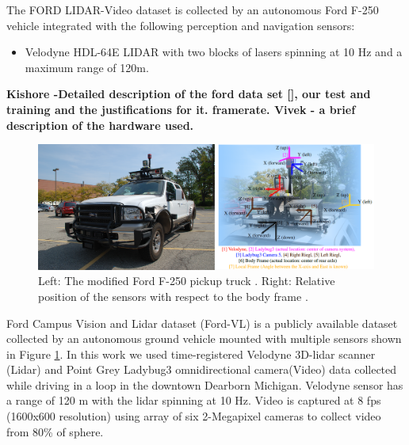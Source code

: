 \documentclass{article}
\begin{document}
The FORD LIDAR-Video dataset \cite{Pandey2011Ford-campu} is collected by an autonomous Ford F-250 vehicle integrated with the following perception and navigation sensors:
\begin{itemize}
    \item Velodyne HDL-64E LIDAR with two blocks of lasers spinning at 10 Hz and a maximum range of 120m.
\end{itemize}

\textbf{ Kishore -Detailed description of the ford data set [], our test and training and the justifications for it. framerate. 
Vivek - a brief description of the hardware used. }

\begin{figure}[htbp]
    \centering
        \includegraphics[scale=0.45]{Figures/ford-truck-sensors.png}
    \caption{Left: The modified Ford F-250 pickup truck \cite{Pandey2011Ford-campu}. Right: Relative position of the sensors with respect to the body frame \cite{Pandey2011Ford-campu}.}
    \label{fig:ford-truck-sensors}
\end{figure}

Ford Campus Vision and Lidar dataset \cite{Pandey2011Ford-campu} (Ford-VL) is a publicly available dataset collected by an autonomous ground vehicle mounted with multiple sensors shown in Figure \ref{fig:ford-truck-sensors}. In this work we used time-registered Velodyne 3D-lidar scanner (Lidar) and Point Grey Ladybug3 omnidirectional camera(Video) data collected while driving in a loop in the downtown Dearborn Michigan. Velodyne sensor has a range of 120 m with the lidar spinning at 10 Hz. Video is captured at 8 fps (1600x600 resolution) using array of six 2-Megapixel cameras to collect video from 80\% of sphere.  
\end{document}
